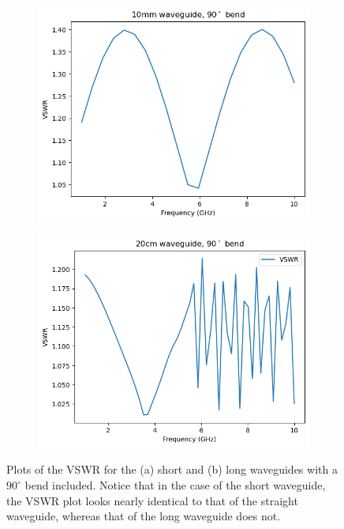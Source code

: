 \begin{figure}
	\centering
	\begin{subfigure}{0.4\textwidth}
		\includegraphics[scale=0.5]{images/plots/short-finitecond-bend-sharp.png}
		\caption{}
		\label{short-finitecond-bend-sharp}
	\end{subfigure}
	\hspace{2cm}
	\begin{subfigure}{0.4\textwidth}
		\includegraphics[scale=0.5]{images/plots/long-finitecond-bend-sharp.png}
		\caption{}
		\label{long-finitecond-bend-sharp}
	\end{subfigure}
	\caption{Plots of the VSWR for the (a) short and (b) long waveguides with a \( 90^{\circ} \) bend
		included. Notice that in the case of the short waveguide, the VSWR plot looks nearly identical to
	that of the straight waveguide, whereas that of the long waveguide does not.}
	\label{sharp-bends}
\end{figure}

